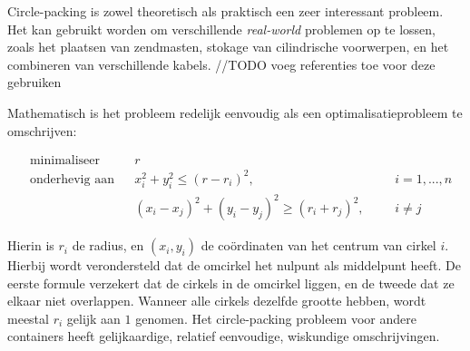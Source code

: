 \documentclass[12pt,a4paper,oneside]{book}
\begin{document}
Circle-packing is zowel theoretisch als praktisch een zeer interessant probleem.
Het kan gebruikt worden om verschillende \textit{real-world} problemen op te lossen, zoals het plaatsen van zendmasten, stokage van cilindrische voorwerpen, en het combineren van verschillende kabels. //TODO voeg referenties toe voor deze gebruiken

Mathematisch is het probleem redelijk eenvoudig als een optimalisatieprobleem te omschrijven:

\begin{equation*}
\begin{aligned}
& \text{minimaliseer}
& & r \\
& \text{onderhevig aan}
& & x_i^2 + y_i^2 \leq (r-r_i)^2, 
& & &i = {1,...,n}\\
&&& (x_i - x_j)^2 + (y_i - y_j)^2 \geq (r_i + r_j)^2,
& & &i \neq j
\end{aligned}
\end{equation*}

Hierin is $r_i$ de radius, en $(x_i,y_i)$ de coördinaten van het centrum van cirkel $i$.
Hierbij wordt verondersteld dat de omcirkel het nulpunt als middelpunt heeft.
De eerste formule verzekert dat de cirkels in de omcirkel liggen, en de tweede dat ze elkaar niet overlappen.
Wanneer alle cirkels dezelfde grootte hebben, wordt meestal $r_i$ gelijk aan $1$ genomen.
Het circle-packing probleem voor andere containers heeft gelijkaardige, relatief eenvoudige, wiskundige omschrijvingen.
\end{document}
